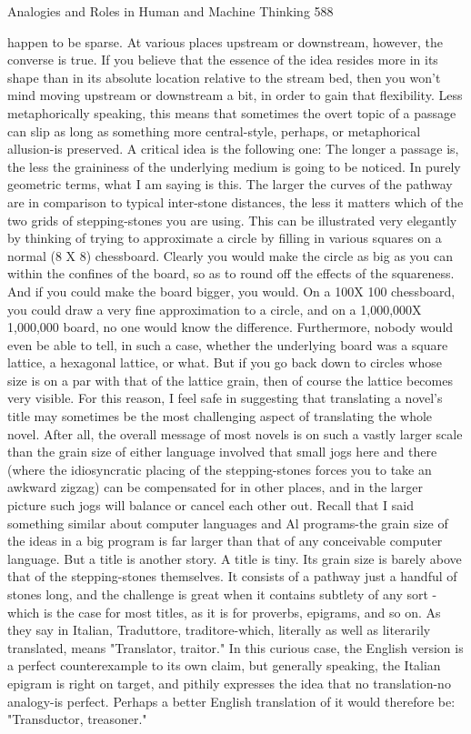 Analogies and Roles in Human and Machine Thinking                                     588

happen to be sparse. At various places upstream or downstream, however, the
converse is true. If you believe that the essence of the idea resides more in its shape
than in its absolute location relative to the stream bed, then you won't mind moving
upstream or downstream a bit, in order to gain that flexibility. Less metaphorically
speaking, this means that sometimes the overt topic of a passage can slip as long as
something more central-style, perhaps, or metaphorical allusion-is preserved.
         A critical idea is the following one: The longer a passage is, the less the
graininess of the underlying medium is going to be noticed. In purely geometric
terms, what I am saying is this. The larger the curves of the pathway are in
comparison to typical inter-stone distances, the less it matters which of the two grids
of stepping-stones you are using. This can be illustrated very elegantly by thinking of
trying to approximate a circle by filling in various squares on a normal (8 X 8)
chessboard. Clearly you would make the circle as big as you can within the confines
of the board, so as to round off the effects of the squareness. And if you could make
the board bigger, you would. On a 100X 100 chessboard, you could draw a very fine
approximation to a circle, and on a 1,000,000X 1,000,000 board, no one would know
the difference. Furthermore, nobody would even be able to tell, in such a case,
whether the underlying board was a square lattice, a hexagonal lattice, or what. But if
you go back down to circles whose size is on a par with that of the lattice grain, then
of course the lattice becomes very visible.
         For this reason, I feel safe in suggesting that translating a novel's title may
sometimes be the most challenging aspect of translating the whole novel. After all, the
overall message of most novels is on such a vastly larger scale than the grain size of
either language involved that small jogs here and there (where the idiosyncratic
placing of the stepping-stones forces you to take an awkward zigzag) can be
compensated for in other places, and in the larger picture such jogs will balance or
cancel each other out. Recall that I said something similar about computer languages
and Al programs-the grain size of the ideas in a big program is far larger than that of
any conceivable computer language.
         But a title is another story. A title is tiny. Its grain size is barely above that of
the stepping-stones themselves. It consists of a pathway just a handful of stones long,
and the challenge is great when it contains subtlety of any sort -which is the case for
most titles, as it is for proverbs, epigrams, and so on. As they say in Italian,
Traduttore, traditore-which, literally as well as literarily translated, means "Translator,
traitor." In this curious case, the English version is a perfect counterexample to its
own claim, but generally speaking, the Italian epigram is right on target, and pithily
expresses the idea that no translation-no analogy-is perfect. Perhaps a better English
translation of it would therefore be: "Transductor, treasoner."

